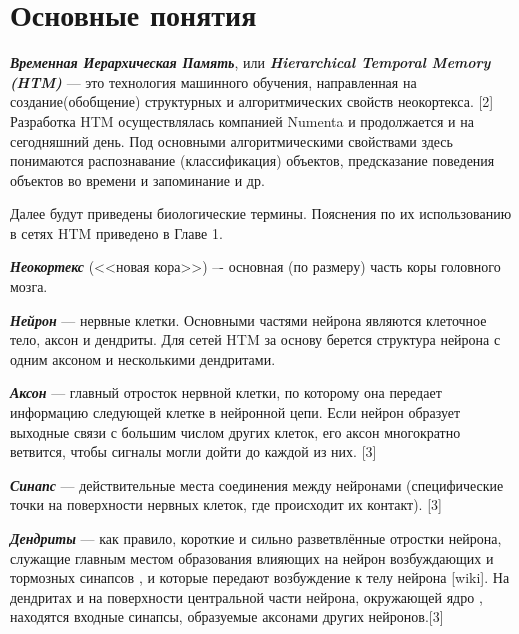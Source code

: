 \chapter{Основные понятия}\label{chp:main_definitions}
\textbf{ \textit{Временная Иерархическая Память}}, или \textbf{\textit{Hierarchical Temporal Memory (HTM)}} --- это технология машинного обучения, направленная на  создание(обобщение) структурных и алгоритмических свойств неокортекса. [2] Разработка HTM осуществлялась компанией Numenta и продолжается и на сегодняшний день. Под основными алгоритмическими свойствами здесь понимаются распознавание (классификация) объектов, предсказание поведения объектов во времени и запоминание и др.
 
Далее будут приведены биологические термины. Пояснения по их использованию в сетях HTM приведено в Главе 1. 

\textbf{\textit{Неокортекс}} (<<новая кора>>) –- основная (по размеру) часть коры головного мозга.

\textbf{\textit{Нейрон}} --- нервные клетки. Основными частями нейрона являются клеточное тело, аксон и дендриты. Для сетей HTM за основу берется структура нейрона с одним аксоном и несколькими дендритами. 

\textbf{\textit{Аксон}} --- главный отросток нервной клетки, по которому она передает информацию следующей клетке в нейронной цепи. Если нейрон образует выходные связи с большим числом других клеток, его аксон многократно ветвится, чтобы сигналы могли дойти до каждой из них. [3]

\textbf{\textit{Синапс}} --- действительные места соединения между нейронами (специфические точки на поверхности нервных клеток, где происходит их контакт). [3]

\textbf{\textit{Дендриты}} ---  как правило, короткие и сильно разветвлённые отростки нейрона, служащие главным местом образования влияющих на нейрон возбуждающих и тормозных синапсов , и которые передают возбуждение к телу нейрона [wiki]. На дендритах и на поверхности центральной части нейрона, окружающей ядро , находятся входные синапсы, образуемые аксонами других нейронов.[3]